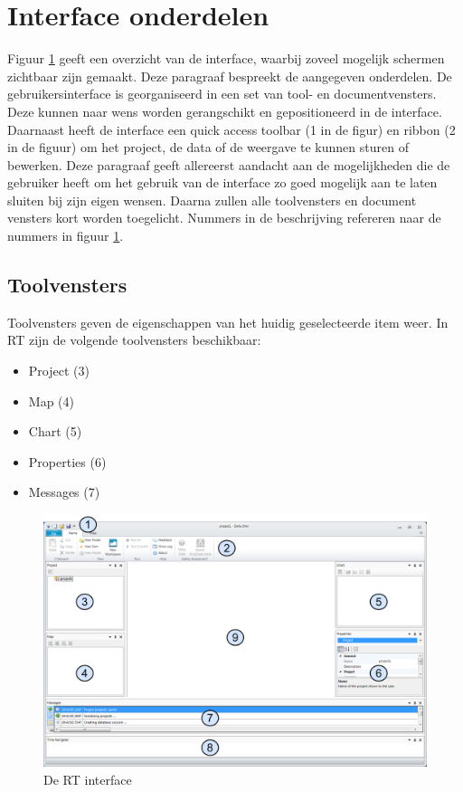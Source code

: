 \section{Interface onderdelen}
	\label{sec:DS:InterfaceOnderdelen}
Figuur \ref{fig:RT_Welcome_Page} geeft een overzicht van de interface, waarbij zoveel mogelijk schermen zichtbaar zijn gemaakt. Deze paragraaf bespreekt de aangegeven onderdelen. De gebruikersinterface is georganiseerd in een set van tool- en documentvensters. Deze kunnen naar wens worden gerangschikt en gepositioneerd in de interface. Daarnaast heeft de interface een quick access toolbar (1 in de figur) en ribbon (2 in de figuur) om het project, de data of de weergave te kunnen sturen of bewerken. Deze paragraaf geeft allereerst aandacht aan de mogelijkheden die de gebruiker heeft om het gebruik van de interface zo goed mogelijk aan te laten sluiten bij zijn eigen wensen. Daarna zullen alle toolvensters en document vensters kort worden toegelicht. Nummers in de beschrijving refereren naar de nummers in figuur \ref{fig:RT_Welcome_Page}.

\subsection*{Toolvensters}
Toolvensters geven de eigenschappen van het huidig geselecteerde item weer. In RT zijn de volgende toolvensters beschikbaar:
\begin{itemize}
\item Project (3)
\item Map (4)
\item Chart (5)
\item Properties (6)
\item Messages (7)
\end{itemize}

\begin{figure}[H]
	\centering
		\includegraphics[width=\textwidth]{figures/chapter_general/rt_Welcome.png}
		\caption{De RT interface}
	\label{fig:RT_Welcome_Page}
\end{figure}


